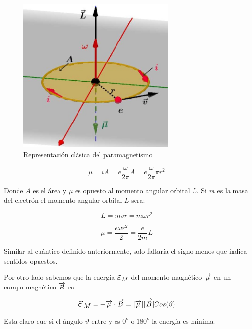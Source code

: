 \begin{figure}[H]
    \centering
    \includegraphics[width=0.7\textwidth]{./Figures/fig_s7}
	\caption{Representación clásica del paramagnetismo}
	\label{fig:s7}
\end{figure}


\begin{equation}
  \mu= iA = e \frac{\omega}{2\pi}A = e \frac{\omega}{2\pi} \pi r^{2}
\end{equation}

Donde $A$ es el área y $\mu$ es opuesto al momento angular orbital $L$. Si $m$ es la masa del electrón el momento angular orbital $L$ sera:

\begin{equation}
  L=mvr=m\omega r^{2}
\end{equation}


\begin{equation}
  \mu=\frac{e\omega r^{2}}{2}=\frac{e}{2m}L
\end{equation}

Similar al cuántico definido anteriormente, solo faltaría el signo menos que indica sentidos opuestos.

Por otro lado sabemos que la energía $\Bb{\varepsilon}_{M}$ del momento magnético $\overrightarrow{\mu}$ en un campo magnético $\overrightarrow{B}$ es 

\begin{equation*}
	\Bb{\varepsilon}_{M}=-\V{\mu}\cdot \V{B}= |\V{\mu}||\V{B}|Cos(\vartheta)
\end{equation*}

Esta claro que si el ángulo $\vartheta$ entre \V{\mu} y  es $0^{o}$ o $180^{o}$ la
energía es mínima.


